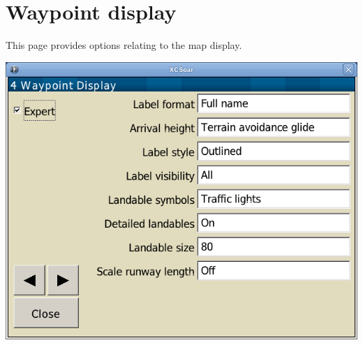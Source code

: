 \clearpage
\section{Waypoint display}\label{sec:waypoint-display}

This page provides options relating to the map display.

\begin{center}
\includegraphics[angle=0,width=0.8\linewidth,keepaspectratio='true']{figures/config-map_waypoint.png}
\end{center}

